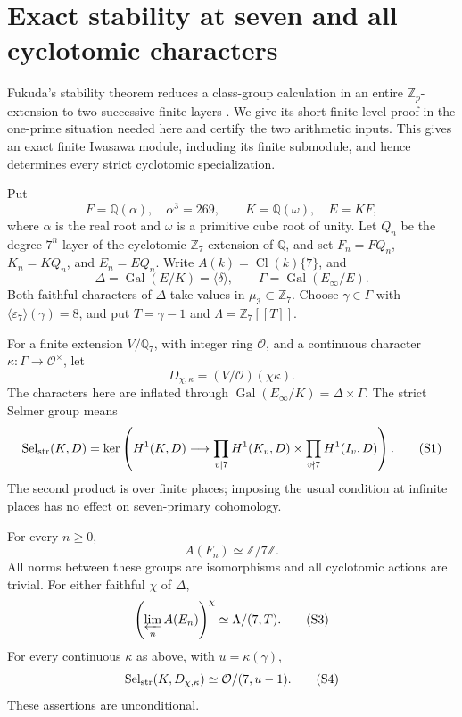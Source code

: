 \section{Exact stability at seven and all cyclotomic characters}
\label{seven:section}

Fukuda's stability theorem reduces a class-group calculation in an entire
$\mathbb Z_p$-extension to two successive finite layers
\cite[Theorem~1(1), p.~264]{sevenFukuda1994}.
We give its short finite-level proof in the one-prime situation needed here
and certify the two arithmetic inputs. This gives an exact finite Iwasawa
module, including its finite submodule, and hence determines every strict
cyclotomic specialization.

Put
\[
 F=\mathbb Q(\alpha),\quad \alpha^3=269,\qquad
 K=\mathbb Q(\omega),\quad E=KF,
\]
where $\alpha$ is the real root and $\omega$ is a primitive cube root of unity.
Let $Q_n$ be the degree-$7^n$ layer of the cyclotomic
$\mathbb Z_7$-extension of $\mathbb Q$, and set
$F_n=FQ_n$, $K_n=KQ_n$, and $E_n=EQ_n$.
Write $A(k)=\operatorname{Cl}(k)\{7\}$, and
\[
 \Delta=\operatorname{Gal}(E/K)=\langle\delta\rangle,\qquad
 \Gamma=\operatorname{Gal}(E_\infty/E).
\]
Both faithful characters of $\Delta$ take values in $\mu_3\subset\mathbb Z_7$.
Choose $\gamma\in\Gamma$ with
$\langle\varepsilon_7\rangle(\gamma)=8$, and put
$T=\gamma-1$ and $\Lambda=\mathbb Z_7[[T]]$.

For a finite extension $V/\mathbb Q_7$, with integer ring $\mathcal O$, and
a continuous character $\kappa:\Gamma\longrightarrow\mathcal O^\times$,
let
\[
 D_{\chi,\kappa}=(V/\mathcal O)(\chi\kappa).
\]
The characters here are inflated through
$\operatorname{Gal}(E_\infty/K)=\Delta\times\Gamma$.
The strict Selmer group means
\[
 \operatorname{Sel}_{\rm str}(K,D)=
 \ker\left(
 H^1(K,D)\longrightarrow
 \prod_{v\mid7}H^1(K_v,D)
 \times\prod_{v\nmid7}H^1(I_v,D)\right).
 \tag{S1}\label{seven:strict-definition}
\]
The second product is over finite places; imposing the usual condition at
infinite places has no effect on seven-primary cohomology.

\begin{theorem}\label{seven:main}
For every $n\ge0$,
\[
 A(F_n)\simeq\mathbb Z/7\mathbb Z.
 \tag{S2}\label{seven:class-stability}
\]
All norms between these groups are isomorphisms and all cyclotomic actions
are trivial. For either faithful $\chi$ of $\Delta$,
\[
 \left(\varprojlim_n A(E_n)\right)^\chi
 \simeq\Lambda/(7,T).
 \tag{S3}\label{seven:iwasawa}
\]
For every continuous $\kappa$ as above, with $u=\kappa(\gamma)$,
\[
 \operatorname{Sel}_{\rm str}(K,D_{\chi,\kappa})
 \simeq\mathcal O/(7,u-1).
 \tag{S4}\label{seven:all-characters}
\]
These assertions are unconditional.
\end{theorem}

